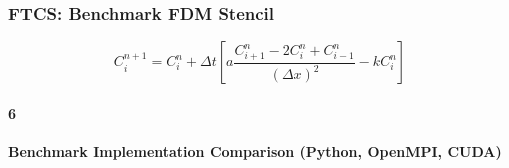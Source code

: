 \subsubsection*{FTCS: Benchmark FDM Stencil}
\begin{equation}
\label{eq:ftcsstencil}
C_i^{n+1} = C_i^n + \Delta t \left[ a \frac{C_{i+1}^n - 2C_i^n + C_{i-1}^n}{(\Delta x)^2} - kC_i^n \right]
\end{equation}

\renewcommand*\contentsname{}
\tableofcontents

\paragraph{6} \textbf{Benchmark Implementation Comparison (Python, OpenMPI, CUDA)}
